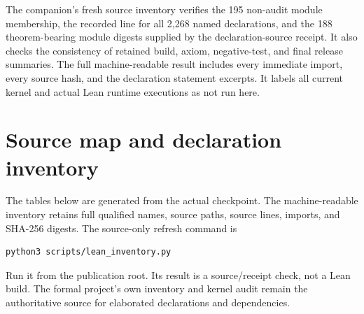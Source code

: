 \documentclass[11pt]{article}
\begin{document}
The companion's fresh source inventory verifies the 195 non-audit module
membership, the recorded line for all 2,268 named declarations, and the 188
theorem-bearing module digests supplied by the declaration-source receipt. It
also checks the consistency of retained build, axiom, negative-test, and final
release summaries. The full machine-readable result includes every immediate
import, every source hash, and the declaration statement excerpts. It labels
all current kernel and actual Lean runtime executions as not run here.

\appendix
\section{Source map and declaration inventory}
The tables below are generated from the actual checkpoint. The machine-readable
inventory retains full qualified names, source paths, source lines, imports,
and SHA-256 digests. The source-only refresh command is
\begin{lstlisting}[style=LeanCode]
python3 scripts/lean_inventory.py
\end{lstlisting}
Run it from the publication root. Its result is a source/receipt check, not a
Lean build. The formal project's own inventory and kernel audit remain the
authoritative source for elaborated declarations and dependencies.
\end{document}
